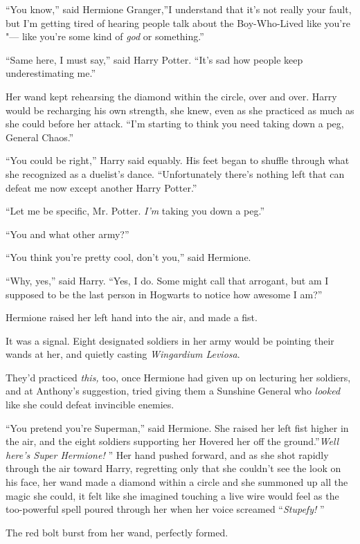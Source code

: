 ``You know,'' said Hermione Granger,''I understand that it's not really
your fault, but I'm getting tired of hearing people talk about the
Boy-Who-Lived like you're "--- like you're some kind of \emph{god} or
something.''

``Same here, I must say,'' said Harry Potter. ``It's sad how people keep
underestimating me.''

Her wand kept rehearsing the diamond within the circle, over and over.
Harry would be recharging his own strength, she knew, even as she
practiced as much as she could before her attack. ``I'm starting to
think you need taking down a peg, General Chaos.''

``You could be right,'' Harry said equably. His feet began to shuffle
through what she recognized as a duelist's dance. ``Unfortunately
there's nothing left that can defeat me now except another Harry
Potter.''

``Let me be specific, Mr. Potter. \emph{I'm} taking you down a peg.''

``You and what other army?''

``You think you're pretty cool, don't you,'' said Hermione.

``Why, yes,'' said Harry. ``Yes, I do. Some might call that arrogant,
but am I supposed to be the last person in Hogwarts to notice how
awesome I am?''

Hermione raised her left hand into the air, and made a fist.

It was a signal. Eight designated soldiers in her army would be pointing
their wands at her, and quietly casting \emph{Wingardium Leviosa}.

They'd practiced \emph{this,} too, once Hermione had given up on
lecturing her soldiers, and at Anthony's suggestion, tried giving them a
Sunshine General who \emph{looked} like she could defeat invincible
enemies.

``You pretend you're Superman,'' said Hermione. She raised her left fist
higher in the air, and the eight soldiers supporting her Hovered her off
the ground.''\emph{Well here's Super Hermione!} '' Her hand pushed
forward, and as she shot rapidly through the air toward Harry,
regretting only that she couldn't see the look on his face, her wand
made a diamond within a circle and she summoned up all the magic she
could, it felt like she imagined touching a live wire would feel as the
too-powerful spell poured through her when her voice screamed
``\emph{Stupefy!} ''

The red bolt burst from her wand, perfectly formed.

